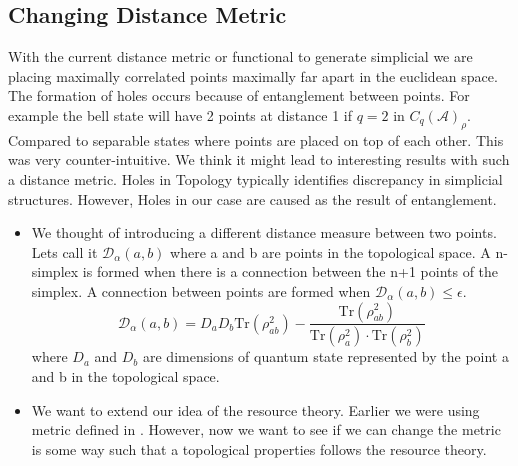 \subsection{Changing Distance Metric}
With the current distance metric or functional to generate simplicial we are placing maximally correlated points maximally far apart in the euclidean space. The formation of holes occurs because of entanglement between points. For example the bell state will have 2 points at distance 1 if $q=2$ in $C_q(\mathcal{A})_\rho$. Compared to separable states where points are placed on top of each other. This was very counter-intuitive. We think it might lead to interesting results with such a distance metric. Holes in Topology typically identifies discrepancy in simplicial structures. However, Holes in our case are caused as the result of entanglement.
\begin{itemize}
    \item We thought of introducing a different distance measure between two points. Lets call it $\mathcal{D}_\alpha(a,b)$ where a and b are points in the topological space. A n-simplex is formed when there is a connection between the n+1 points of the simplex. A connection between points are formed when $\mathcal{D}_\alpha(a,b) \leq \epsilon$.
    \begin{equation}
        \mathcal{D}_\alpha(a,b) = D_a D_b \text{Tr}(\rho^2_{ab}) - \frac{\text{Tr}(\rho^2_{ab})}{\text{Tr}(\rho^2_{a}) \cdot \text{Tr}(\rho^2_{b}) }
    \end{equation}
    where $D_a$ and $D_b$ are dimensions of quantum state represented by the point a and b in the topological space. 
    \item We want to extend our idea of the resource theory. Earlier we were using metric defined in \cite{hamilton2023probing}. However, now we want to see if we can change the metric is some way such that a topological properties follows the resource theory.
\end{itemize}
